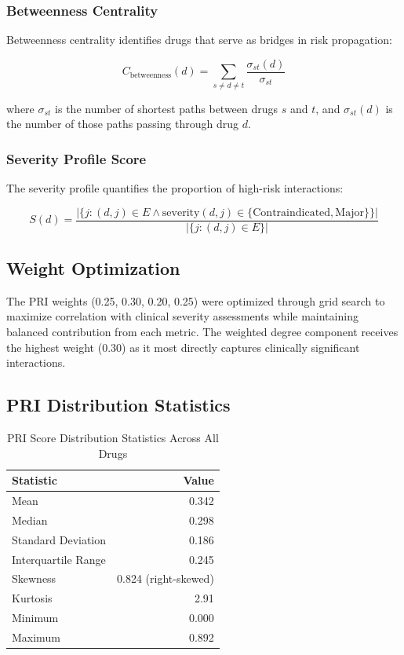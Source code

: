 \documentclass[11pt,a4paper]{article}
\begin{document}
\subsubsection{Betweenness Centrality}

Betweenness centrality identifies drugs that serve as bridges in risk propagation:

\begin{equation}
C_{\text{betweenness}}(d) = \sum_{s \neq d \neq t} \frac{\sigma_{st}(d)}{\sigma_{st}}
\end{equation}

where $\sigma_{st}$ is the number of shortest paths between drugs $s$ and $t$, and $\sigma_{st}(d)$ is the number of those paths passing through drug $d$.

\subsubsection{Severity Profile Score}

The severity profile quantifies the proportion of high-risk interactions:

\begin{equation}
S(d) = \frac{|\{j : (d,j) \in E \land \text{severity}(d,j) \in \{\text{Contraindicated}, \text{Major}\}\}|}{|\{j : (d,j) \in E\}|}
\end{equation}

\subsection{Weight Optimization}

The PRI weights (0.25, 0.30, 0.20, 0.25) were optimized through grid search to maximize correlation with clinical severity assessments while maintaining balanced contribution from each metric. The weighted degree component receives the highest weight (0.30) as it most directly captures clinically significant interactions.

\subsection{PRI Distribution Statistics}

\begin{table}[H]
\centering
\caption{PRI Score Distribution Statistics Across All Drugs}
\label{tab:pri_stats}
\begin{tabular}{lr}
\toprule
\textbf{Statistic} & \textbf{Value} \\
\midrule
Mean & 0.342 \\
Median & 0.298 \\
Standard Deviation & 0.186 \\
Interquartile Range & 0.245 \\
Skewness & 0.824 (right-skewed) \\
Kurtosis & 2.91 \\
Minimum & 0.000 \\
Maximum & 0.892 \\
\bottomrule
\end{tabular}
\end{table}
\end{document}
